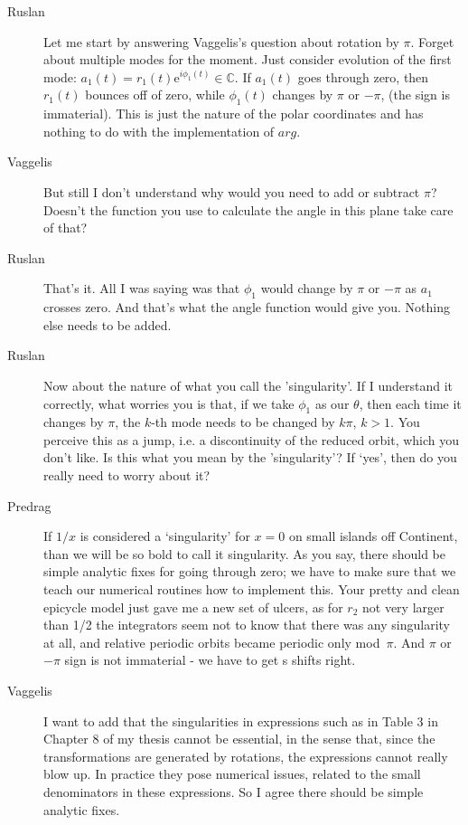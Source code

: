 \begin{description}
\item[Ruslan]
    Let me start by answering Vaggelis's question about rotation
by $\pi$.  Forget about multiple modes for the moment.  Just
consider evolution of the first mode: $a_1(t) =
r_1(t)\mathrm{e}^{i\phi_1(t)} \in \mathbb{C}$.  If $a_1(t)$
goes through zero, then $r_1(t)$ bounces off of zero, while
$\phi_1(t)$ changes by $\pi$ or $-\pi$, (the sign is
immaterial).   This is just the nature of the polar
coordinates and has nothing to do with the implementation of
$arg$.

\item[Vaggelis]
But still I don't understand why would you need to add or subtract
$\pi$? Doesn't the function you use to calculate the angle in this
plane take care of that?

\item[Ruslan]
That's it.  All I was saying
was that $\phi_1$ would change by $\pi$ or $-\pi$ as $a_1$
crosses zero.  And that's what the angle function would give
you.  Nothing else needs to be added.

\item[Ruslan]
Now about the nature of what you call the 'singularity'.  If
I understand it correctly, what worries you is that, if we
take $\phi_1$ as our $\theta$, then each time it changes by
$\pi$, the $k$-th mode needs to be changed by $k\pi$, $k >
1$.  You perceive this as a jump, i.e. a discontinuity of the
reduced orbit, which you don't like.  Is this what you mean
by the 'singularity'? If `yes', then do you really need to
worry about it?

\item[Predrag]
If $1/x$ is considered a
`singularity' for $x=0$ on small islands off Continent, than
we will be so bold to call it singularity. As you say, there
should be simple analytic fixes for going through zero; we
have to make sure that we teach our numerical routines how to
implement this. Your pretty and clean epicycle model just
gave me a new set of ulcers, as for $r_2$ not very larger
than 1/2 the integrators seem not to know that there was any
singularity at all, and relative periodic orbits became
periodic only mod~$\pi$. And $\pi$ or $-\pi$  sign is not
immaterial - we have to get \rpo s shifts right.

\item[Vaggelis]
I want to add that the singularities in expressions such as
in Table 3 in Chapter 8 of my
thesis cannot be essential, in the sense that, since the transformations
are generated by rotations, the expressions
cannot really blow up. In practice they pose numerical issues,
related to the small denominators in these expressions. So I agree there
should be simple analytic fixes.


\end{description}
